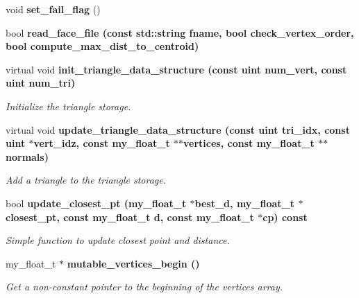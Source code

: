 \begin{CompactItemize}
\item 
void \textbf{set\_\-fail\_\-flag} ()\label{classASCbase_1_1geometry_1_1SimpleTrimeshTwo_34482bae5d76b139413cbb0c4dccf896}

\item 
bool \bf{read\_\-face\_\-file} (const std::string fname, bool check\_\-vertex\_\-order, bool compute\_\-max\_\-dist\_\-to\_\-centroid)
\item 
virtual void \bf{init\_\-triangle\_\-data\_\-structure} (const uint num\_\-vert, const uint num\_\-tri)\label{classASCbase_1_1geometry_1_1SimpleTrimeshTwo_15e4bc317ef6f01d9d59798708dd0a9a}

\begin{CompactList}\small\item\em Initialize the triangle storage. \item\end{CompactList}\item 
virtual void \bf{update\_\-triangle\_\-data\_\-structure} (const uint tri\_\-idx, const uint $\ast$vert\_\-idz, const my\_\-float\_\-t $\ast$$\ast$vertices, const my\_\-float\_\-t $\ast$$\ast$normals)\label{classASCbase_1_1geometry_1_1SimpleTrimeshTwo_1e6fafae2016945f5e855765a456e1fd}

\begin{CompactList}\small\item\em Add a triangle to the triangle storage. \item\end{CompactList}\item 
bool \bf{update\_\-closest\_\-pt} (my\_\-float\_\-t $\ast$best\_\-d, my\_\-float\_\-t $\ast$closest\_\-pt, const my\_\-float\_\-t d, const my\_\-float\_\-t $\ast$cp) const 
\begin{CompactList}\small\item\em Simple function to update closest point and distance. \item\end{CompactList}\item 
my\_\-float\_\-t $\ast$ \bf{mutable\_\-vertices\_\-begin} ()
\begin{CompactList}\small\item\em Get a non-constant pointer to the beginning of the vertices array. \item\end{CompactList}\end{CompactItemize}

